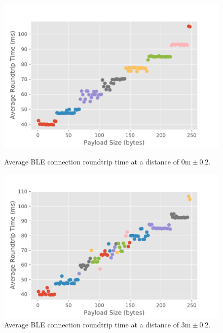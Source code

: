 \begin{figure}[H]
    \begin{minipage}[r]{0.49\linewidth}
    \centering
    \includegraphics[width=\linewidth]{images/ble-roundtrip-hci0-0cm.pdf}
    \caption[Average \acs{BLE} connection roundtrip time at a distance of 0m.]{Average \acs{BLE} connection roundtrip time at a distance of $0\text{m} \pm 0.2$.}
    \label{fig:ble-roundtrip-0cm}
    \end{minipage}
    \begin{minipage}[l]{0.49\linewidth}
        \centering
        \includegraphics[width=\linewidth]{images/ble-roundtrip-hci0-300cm.pdf}
        \caption[Average \acs{BLE} connection roundtrip time at a distance of 3m.]{Average \acs{BLE} connection roundtrip time at a distance of $3\text{m} \pm 0.2$.}
        \label{fig:ble-roundtrip-3cm}
        \end{minipage}
\end{figure}


